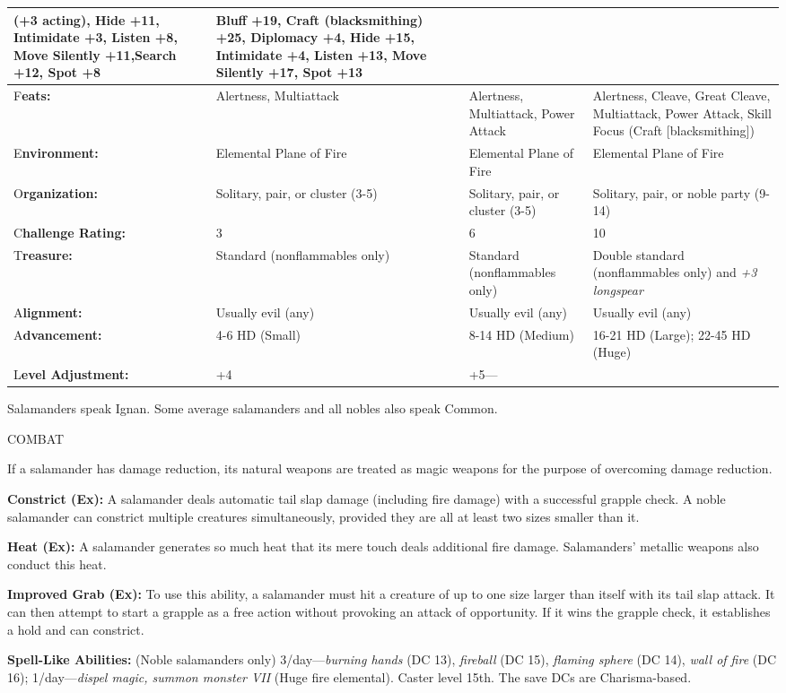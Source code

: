 \documentclass{article}
\begin{document}
\begin{tabular}{|>{\raggedright}p{48pt}|>{\raggedright}p{84pt}|>{\raggedright}p{84pt}|>{\raggedright}p{84pt}|}
(+3 acting), Hide +11, Intimidate +3, Listen +8, Move Silently +11,Search +12, 
Spot +8 & Bluff +19, Craft (blacksmithing) +25, Diplomacy +4, Hide +15, Intimidate 
+4, Listen +13, Move Silently +17, Spot +13\tabularnewline
\hline
F\textbf{eats:} & Alertness, Multiattack & Alertness, Multiattack, Power Attack & Alertness, 
Cleave, Great Cleave, Multiattack, Power Attack, Skill Focus (Craft [blacksmithing])\tabularnewline
\hline
E\textbf{nvironment:} & Elemental Plane of Fire & Elemental Plane of Fire & Elemental 
Plane of Fire\tabularnewline
\hline
O\textbf{rganization:} & Solitary, pair, or cluster (3-5) & Solitary, pair, or 
cluster (3-5) & Solitary, pair, or noble party (9-14)\tabularnewline
\hline
C\textbf{hallenge Rating:} & 3 & 6 & 10\tabularnewline
\hline
T\textbf{reasure:} & Standard (nonflammables only) & Standard (nonflammables only) & Double 
standard (nonflammables only) and \textit{+3 longspear}\tabularnewline
\hline
A\textbf{lignment:} & Usually evil (any) & Usually evil (any) & Usually evil (any)\tabularnewline
\hline
A\textbf{dvancement:} & 4-6 HD (Small) & 8-14 HD (Medium) & 16-21 HD (Large); 22-45 
HD (Huge)\tabularnewline
\hline
L\textbf{evel Adjustment:} & +4 & +5--- & \tabularnewline
\hline
\end{tabular}

\vspace{12pt}
Salamanders speak Ignan. Some average salamanders and all nobles also speak Common.

COMBAT

If a salamander has damage reduction, its natural weapons are treated as magic 
weapons for the purpose of overcoming damage reduction.

\textbf{Constrict (Ex): }A salamander deals automatic tail slap damage (including 
fire damage) with a successful grapple check. A noble salamander can constrict 
multiple creatures simultaneously, provided they are all at least two sizes smaller 
than it.

\textbf{Heat (Ex):} A salamander generates so much heat that its mere touch deals 
additional fire damage. Salamanders' metallic weapons also conduct this heat.

\textbf{Improved Grab (Ex):} To use this ability, a salamander must hit a creature 
of up to one size larger than itself with its tail slap attack. It can then attempt 
to start a grapple as a free action without provoking an attack of opportunity. 
If it wins the grapple check, it establishes a hold and can constrict.

\textbf{Spell-Like Abilities:} (Noble salamanders only) 3/day---\textit{burning 
hands }(DC 13), \textit{fireball }(DC 15), \textit{flaming sphere }(DC 14), \textit{wall 
of fire }(DC 16); 1/day---\textit{dispel magic, summon monster VII }(Huge fire 
elemental). Caster level 15th. The save DCs are Charisma-based.
\end{document}
